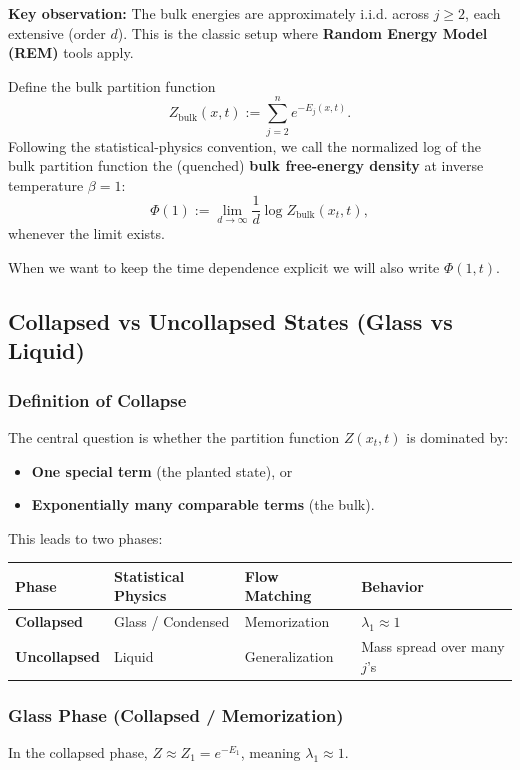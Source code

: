 \documentclass[11pt]{article}
\begin{document}
\textbf{Key observation:} The bulk energies are approximately i.i.d. across $j \geq 2$, each extensive (order $d$). This is the classic setup where \textbf{Random Energy Model (REM)} tools apply.

Define the bulk partition function
\begin{equation}
Z_{\text{bulk}}(x,t) := \sum_{j=2}^n e^{-E_j(x,t)}.
\end{equation}
Following the statistical-physics convention, we call the normalized log of the bulk partition function the (quenched) \textbf{bulk free-energy density} at inverse temperature $\beta = 1$:
\begin{equation}
\Phi(1) := \lim_{d \to \infty} \frac{1}{d} \log Z_{\text{bulk}}(x_t,t),
\end{equation}
whenever the limit exists.

When we want to keep the time dependence explicit we will also write $\Phi(1,t)$.

\subsection{Collapsed vs Uncollapsed States (Glass vs Liquid)}
\subsubsection{Definition of Collapse}
The central question is whether the partition function $Z(x_t, t)$ is dominated by:
\begin{itemize}
\item \textbf{One special term} (the planted state), or
\item \textbf{Exponentially many comparable terms} (the bulk).
\end{itemize}

This leads to two phases:
\begin{center}
\begin{tabular}{@{}llll@{}}
\toprule
Phase & Statistical Physics & Flow Matching & Behavior \\ \midrule
\textbf{Collapsed} & Glass / Condensed & Memorization & $\lambda_1 \approx 1$ \\
\textbf{Uncollapsed} & Liquid & Generalization & Mass spread over many $j$'s \\ \bottomrule
\end{tabular}
\end{center}

\subsubsection{Glass Phase (Collapsed / Memorization)}
In the collapsed phase, $Z \approx Z_1 = e^{-E_1}$, meaning $\lambda_1 \approx 1$.
\end{document}
